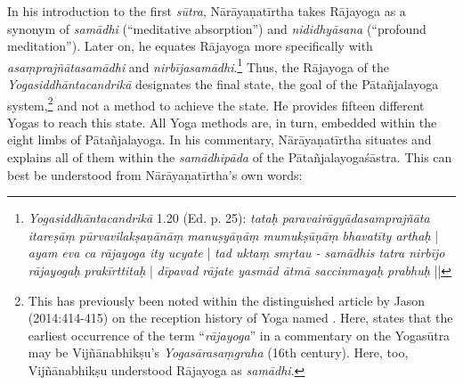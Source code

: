 In his introduction to the first \textit{sūtra}, Nārāyaṇatīrtha takes Rājayoga as a synonym of \textit{samādhi} (``meditative absorption'') and \textit{nididhyāsana} (``profound meditation''). Later on, he equates Rājayoga more specifically with \textit{asaṃprajñātasamādhi} and \textit{nirbījasamādhi}.\footnote{\textit{Yogasiddhāntacandrikā} 1.20 (Ed. p. 25): \textit{tataḥ paravairāgyādasamprajñāta itareṣāṃ pūrvavilakṣaṇānāṃ manuṣyāṇāṃ mumukṣūṇāṃ bhavatīty arthaḥ} | \textit{ayam eva ca rājayoga ity ucyate} | \textit{tad uktaṃ smṛtau - samādhis tatra nirbījo rājayogaḥ prakīrttitaḥ} | \textit{dīpavad rājate yasmād ātmā saccinmayaḥ prabhuḥ} ||} Thus, the Rājayoga of the \emph{Yogasiddhāntacandrikā} designates the final state, the goal of the Pātañjalayoga system,\footnote{This has previously been noted within the distinguished article by Jason \citeauthor{birch2014} (2014:414-415) on the reception history of Yoga named . Here, \citeauthor{birch2014} states that the earliest occurrence of the term ``\textit{rājayoga}'' in a commentary on the Yogasūtra may be Vijñānabhikṣu’s \textit{Yogasārasaṃgraha} (16th century). Here, too, Vijñānabhikṣu understood Rājayoga as \textit{samādhi}.} and not a method to achieve the state. He provides fifteen different Yogas to reach this state. All Yoga methods are, in turn, embedded within the eight limbs of Pātañjalayoga. In his commentary, Nārāyaṇatīrtha situates and explains all of them within the \textit{samādhipāda} of the Pātañjalayogaśāstra. This can best be understood from Nārāyaṇatīrtha's own words: 

